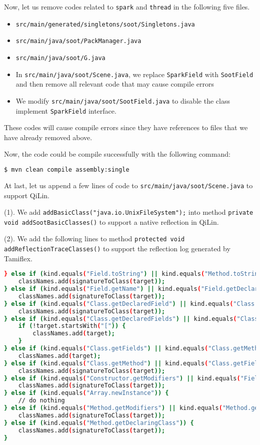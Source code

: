 \documentclass[11pt]{article}
\begin{document}
Now, let us remove codes related to \texttt{spark} and \texttt{thread} in the following five files.
\begin{itemize}
	\item  \texttt{src/main/generated/singletons/soot/Singletons.java} 
	\item \texttt{src/main/java/soot/PackManager.java} 
	\item \texttt{src/main/java/soot/G.java}
	\item In  \texttt{src/main/java/soot/Scene.java}, we replace \texttt{SparkField} with \texttt{SootField} and then remove all  relevant code that may cause compile errors
	\item We modify \texttt{src/main/java/soot/SootField.java} to disable the class implement \texttt{SparkField} interface.
\end{itemize}
These codes will cause compile errors since they have references to files that we have already removed above.

Now, the code could be compile successfully with the following command:
\begin{lstlisting}[language=bash, backgroundcolor = \color{lightgray},]
$ mvn clean compile assembly:single
\end{lstlisting}

At last, let us append a few lines of code to \texttt{src/main/java/soot/Scene.java} to support QiLin.

(1). We add \texttt{addBasicClass("java.io.UnixFileSystem");} into method \texttt{private void addSootBasicClasses()} to support a native reflection in QiLin. 

(2). We add the following lines to method \texttt{protected void addReflectionTraceClasses()} to support the reflection log generated by Tamiflex.

\begin{lstlisting}[language=bash, frame=single, basicstyle=\tiny]
} else if (kind.equals("Field.toString") || kind.equals("Method.toString")) {
	classNames.add(signatureToClass(target));
} else if (kind.equals("Field.getName") || kind.equals("Field.getDeclaringClass")) {
	classNames.add(signatureToClass(target));
} else if (kind.equals("Class.getDeclaredField") || kind.equals("Class.getDeclaredMethod")) {
	classNames.add(signatureToClass(target));
} else if (kind.equals("Class.getDeclaredFields") || kind.equals("Class.getDeclaredMethods")) {
	if (!target.startsWith("[")) {
		classNames.add(target);
	}
} else if (kind.equals("Class.getFields") || kind.equals("Class.getMethods")) {
	classNames.add(target);
} else if (kind.equals("Class.getMethod") || kind.equals("Class.getField")) {
	classNames.add(signatureToClass(target));
} else if (kind.equals("Constructor.getModifiers") || kind.equals("Field.getModifiers")) {
	classNames.add(signatureToClass(target));
} else if (kind.equals("Array.newInstance")) {
	// do nothing
} else if (kind.equals("Method.getModifiers") || kind.equals("Method.getName")) {
	classNames.add(signatureToClass(target));
} else if (kind.equals("Method.getDeclaringClass")) {
	classNames.add(signatureToClass(target));
} 
\end{lstlisting}
\end{document}
